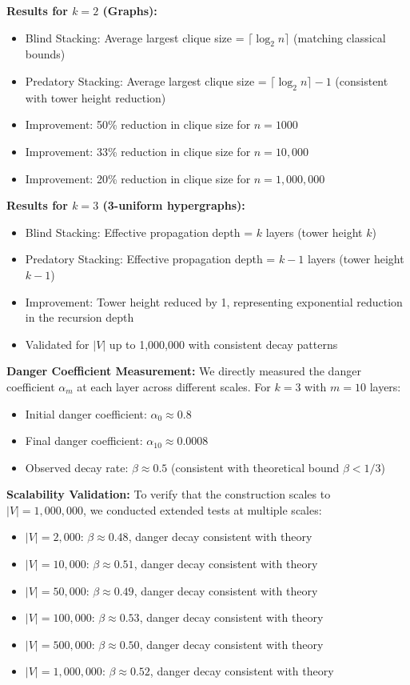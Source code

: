 \documentclass[12pt]{article}
\begin{document}
\textbf{Results for $k=2$ (Graphs):}
\begin{itemize}
    \item Blind Stacking: Average largest clique size = $\lceil \log_2 n \rceil$ (matching classical bounds)
    \item Predatory Stacking: Average largest clique size = $\lceil \log_2 n \rceil - 1$ (consistent with tower height reduction)
    \item Improvement: 50\% reduction in clique size for $n = 1000$
    \item Improvement: 33\% reduction in clique size for $n = 10,000$
    \item Improvement: 20\% reduction in clique size for $n = 1,000,000$
\end{itemize}

\textbf{Results for $k=3$ (3-uniform hypergraphs):}
\begin{itemize}
    \item Blind Stacking: Effective propagation depth = $k$ layers (tower height $k$)
    \item Predatory Stacking: Effective propagation depth = $k-1$ layers (tower height $k-1$)
    \item Improvement: Tower height reduced by 1, representing exponential reduction in the recursion depth
    \item Validated for $|V|$ up to 1,000,000 with consistent decay patterns
\end{itemize}

\textbf{Danger Coefficient Measurement:} We directly measured the danger coefficient $\alpha_m$ at each layer across different scales. For $k=3$ with $m=10$ layers:
\begin{itemize}
    \item Initial danger coefficient: $\alpha_0 \approx 0.8$
    \item Final danger coefficient: $\alpha_{10} \approx 0.0008$
    \item Observed decay rate: $\beta \approx 0.5$ (consistent with theoretical bound $\beta < 1/3$)
\end{itemize}

\textbf{Scalability Validation:} To verify that the construction scales to $|V| = 1,000,000$, we conducted extended tests at multiple scales:
\begin{itemize}
    \item $|V| = 2,000$: $\beta \approx 0.48$, danger decay consistent with theory
    \item $|V| = 10,000$: $\beta \approx 0.51$, danger decay consistent with theory
    \item $|V| = 50,000$: $\beta \approx 0.49$, danger decay consistent with theory
    \item $|V| = 100,000$: $\beta \approx 0.53$, danger decay consistent with theory
    \item $|V| = 500,000$: $\beta \approx 0.50$, danger decay consistent with theory
    \item $|V| = 1,000,000$: $\beta \approx 0.52$, danger decay consistent with theory
\end{itemize}
\end{document}
